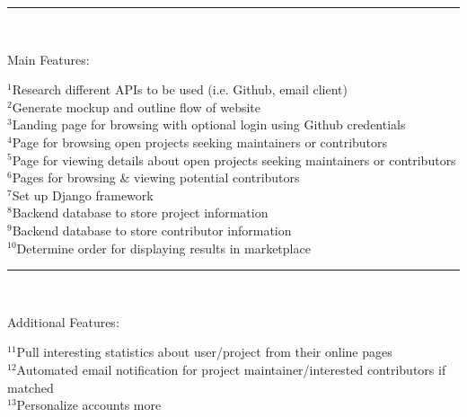 \documentclass[11pt]{article}
\begin{document}
\noindent\rule{8cm}{0.4pt}\\
\begin{footnotesize}
Main Features:
\begin{addmargin}[1em]{2em}
$^{1}$Research different APIs to be used (i.e. Github, email client)\\
$^{2}$Generate mockup and outline flow of website\\
$^{3}$Landing page for browsing with optional login using Github credentials\\
$^{4}$Page for browsing open projects seeking maintainers or contributors\\
$^{5}$Page for viewing details about open projects seeking maintainers or contributors\\
$^{6}$Pages for browsing \& viewing potential contributors\\
$^{7}$Set up Django framework\\
$^{8}$Backend database to store project information\\
$^{9}$Backend database to store contributor information\\
$^{10}$Determine order for displaying results in marketplace
\end{addmargin}
\end{footnotesize}
\noindent\rule{8cm}{0.4pt}\\
\begin{footnotesize}
Additional Features:
\begin{addmargin}[1em]{2em}
$^{11}$Pull interesting statistics about user/project from their online pages\\
$^{12}$Automated email notification for project maintainer/interested contributors if matched\\
$^{13}$Personalize accounts more\\
\end{addmargin}
\end{footnotesize}
\end{document}
